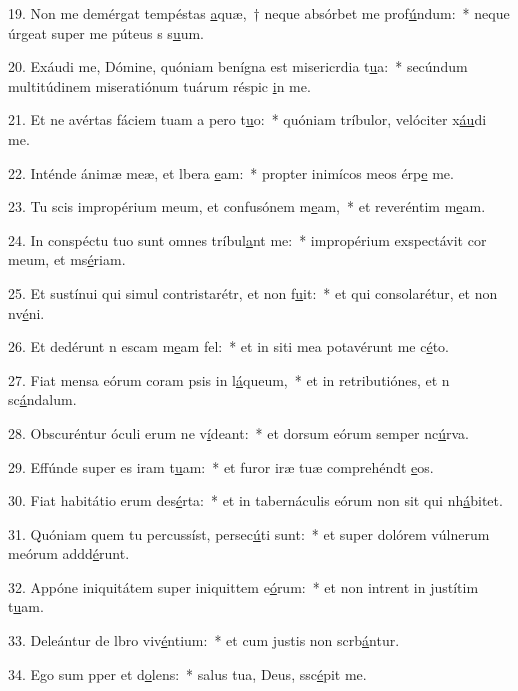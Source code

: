19. Non me demérgat tempéstas \uline{a}quæ,~† neque absórbet me prof\uline{ú}ndum:~* neque úrgeat super me púteus s s\uline{u}um.\par 
20. Exáudi me, Dómine, quóniam benígna est misericrdia t\uline{u}a:~* secúndum multitúdinem miseratiónum tuárum réspic \uline{i}n me.\par 
21. Et ne avértas fáciem tuam a pero t\uline{u}o:~* quóniam tríbulor, velóciter x\uline{áu}di me.\par 
22. Inténde ánimæ meæ, et lbera \uline{e}am:~* propter inimícos meos érp\uline{e} me.\par 
23. Tu scis impropérium meum, et confusónem m\uline{e}am,~* et reveréntim m\uline{e}am.\par 
24. In conspéctu tuo sunt omnes  tríbul\uline{a}nt me:~* impropérium exspectávit cor meum, et ms\uline{é}riam.\par 
25. Et sustínui qui simul contristarétr, et non f\uline{u}it:~* et qui consolarétur, et non nv\uline{é}ni.\par 
26. Et dedérunt n escam m\uline{e}am fel:~* et in siti mea potavérunt me c\uline{é}to.\par 
27. Fiat mensa eórum coram psis in l\uline{á}queum,~* et in retributiónes, et n sc\uline{á}ndalum.\par 
28. Obscuréntur óculi erum ne v\uline{í}deant:~* et dorsum eórum semper nc\uline{ú}rva.\par 
29. Effúnde super es iram t\uline{u}am:~* et furor iræ tuæ comprehéndt \uline{e}os.\par 
30. Fiat habitátio erum des\uline{é}rta:~* et in tabernáculis eórum non sit qui nh\uline{á}bitet.\par 
31. Quóniam quem tu percussíst, persec\uline{ú}ti sunt:~* et super dolórem vúlnerum meórum addd\uline{é}runt.\par 
32. Appóne iniquitátem super iniquittem e\uline{ó}rum:~* et non intrent in justítim t\uline{u}am.\par 
33. Deleántur de lbro viv\uline{é}ntium:~* et cum justis non scrb\uline{á}ntur.\par 
34. Ego sum pper et d\uline{o}lens:~* salus tua, Deus, ssc\uline{é}pit me.\par 
